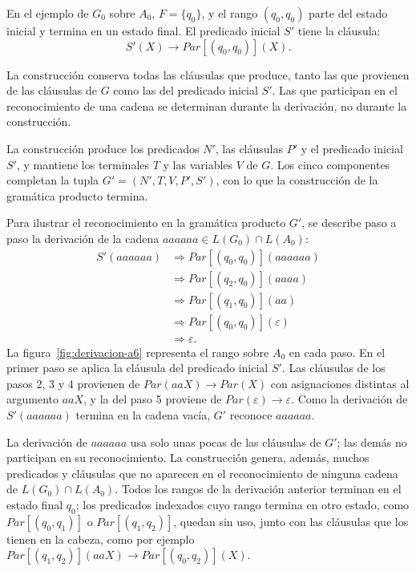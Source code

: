 \documentclass{report}
\theoremstyle{definition}
\theoremstyle{plain}
\theoremstyle{remark}
\begin{document}
En el ejemplo de $G_0$ sobre $A_0$, $F = \{q_0\}$, y el rango
$(q_0, q_0)$ parte del estado inicial y termina en un estado final. El
predicado inicial $S'$ tiene la cláusula:
\[
  S'(X) \to Par[(q_0, q_0)](X).
\]

La construcción conserva todas las cláusulas que produce, tanto las
que provienen de las cláusulas de $G$ como las del predicado inicial
$S'$. Las que participan en el reconocimiento de una cadena se
determinan durante la derivación, no durante la construcción.

La construcción produce los predicados $N'$, las cláusulas $P'$ y el
predicado inicial $S'$, y mantiene los terminales $T$ y las variables
$V$ de $G$. Los cinco componentes completan la tupla
$G' = (N', T, V, P', S')$, con lo que la construcción de la gramática
producto termina.

Para ilustrar el reconocimiento en la gramática producto $G'$, se
describe paso a paso la derivación de la cadena
$aaaaaa \in L(G_0) \cap L(A_0)$:
\begin{align*}
  S'(aaaaaa) &\Rightarrow Par[(q_0, q_0)](aaaaaa) \\
          &\Rightarrow Par[(q_2, q_0)](aaaa) \\
          &\Rightarrow Par[(q_1, q_0)](aa) \\
          &\Rightarrow Par[(q_0, q_0)](\varepsilon) \\
          &\Rightarrow \varepsilon.
\end{align*}
La figura~\ref{fig:derivacion-a6} representa el rango sobre $A_0$ en
cada paso. En el primer paso se aplica la cláusula del predicado
inicial $S'$. Las cláusulas de los pasos 2, 3 y 4 provienen de
$Par(aaX) \to Par(X)$ con asignaciones distintas al argumento $aaX$, y
la del paso 5 proviene de $Par(\varepsilon) \to \varepsilon$. Como la derivación de $S'(aaaaaa)$ termina en la cadena vacía, $G'$
reconoce $aaaaaa$.

La derivación de $aaaaaa$ usa solo unas pocas de las cláusulas de
$G'$; las demás no participan en su reconocimiento. La construcción
genera, además, muchos predicados y cláusulas que no aparecen en el
reconocimiento de ninguna cadena de $L(G_0) \cap L(A_0)$. Todos los
rangos de la derivación anterior terminan en el estado final $q_0$;
los predicados indexados cuyo rango termina en otro estado, como
$Par[(q_0, q_1)]$ o $Par[(q_1, q_2)]$, quedan sin uso, junto con las
cláusulas que los tienen en la cabeza, como por ejemplo
$Par[(q_1, q_2)](aaX) \to Par[(q_0, q_2)](X)$.
\end{document}

